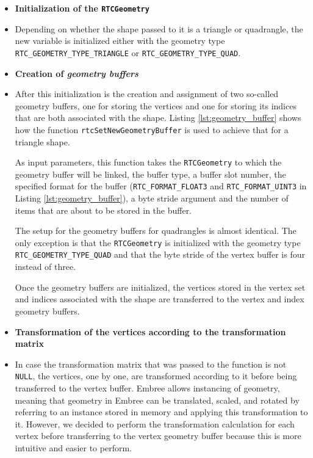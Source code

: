 \begin{itemize}
	\setlength\itemsep{0.05em}
	
	\item \textbf{Initialization of the \texttt{RTCGeometry}}
	\item[] Depending on whether the shape passed to it is a triangle or quadrangle, the new  variable is initialized either with the geometry type \texttt{RTC\_GEOMETRY\_TYPE\_TRIANGLE} or \texttt{RTC\_GEOMETRY\_TYPE\_QUAD}.
	\\
	
	\item \textbf{Creation of \emph{geometry buffers}}
	\item[] After this initialization is the creation and assignment of two so-called geometry buffers, one for storing the vertices and one for storing its indices that are both associated with the shape. Listing \ref{lst:geometry_buffer} shows how the function \texttt{rtcSetNewGeometryBuffer} is used to achieve that for a triangle shape.
	
	As input parameters, this function takes the \texttt{RTCGeometry} to which the geometry buffer will be linked, the buffer type, a buffer slot number, the specified format for the buffer (\texttt{RTC\_FORMAT\_FLOAT3} and \texttt{RTC\_FORMAT\_UINT3} in Listing \ref{lst:geometry_buffer}), a byte stride argument and the number of items that are about to be stored in the buffer. 
	
	The setup for the geometry buffers for quadrangles is almost identical. The only exception is that the \texttt{RTCGeometry} is initialized with the geometry type \texttt{RTC\_GEOMETRY\_TYPE\_QUAD} and that the byte stride of the vertex buffer is four instead of three.
	
	Once the geometry buffers are initialized, the vertices stored in the vertex set and indices associated with the shape are transferred to the vertex and index geometry buffers.
	\\
	
	\item \textbf{Transformation of the vertices according to the transformation matrix}
	\item[] In case the transformation matrix that was passed to the function is not \texttt{NULL}, the vertices, one by one, are transformed according to it before being transferred to the vertex buffer. Embree allows instancing of geometry, meaning that geometry in Embree can be translated, scaled, and rotated by referring to an instance stored in memory and applying this transformation to it. However, we decided to perform the transformation calculation for each vertex before transferring to the vertex geometry buffer because this is more intuitive and easier to perform.
	
\end{itemize}

